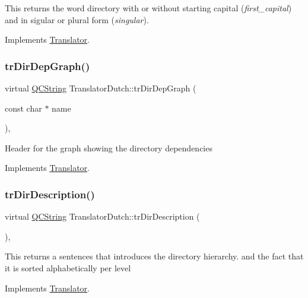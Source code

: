 This returns the word directory with or without starting capital ({\itshape first\+\_\+capital}) and in sigular or plural form ({\itshape singular}). 

Implements \mbox{\hyperlink{class_translator}{Translator}}.

\mbox{\label{class_translator_dutch_a8c004f960001b878331abb3cc622dd1a}} 
\subsubsection{\texorpdfstring{trDirDepGraph()}{trDirDepGraph()}}
{\footnotesize\ttfamily virtual \mbox{\hyperlink{class_q_c_string}{Q\+C\+String}} Translator\+Dutch\+::tr\+Dir\+Dep\+Graph (\begin{DoxyParamCaption}\item[{const char $\ast$}]{name }\end{DoxyParamCaption})\hspace{0.3cm}{\ttfamily [inline]}, {\ttfamily [virtual]}}

Header for the graph showing the directory dependencies 

Implements \mbox{\hyperlink{class_translator}{Translator}}.

\mbox{\label{class_translator_dutch_ae85350288d46c358b611b9de4c17dfcc}} 
\subsubsection{\texorpdfstring{trDirDescription()}{trDirDescription()}}
{\footnotesize\ttfamily virtual \mbox{\hyperlink{class_q_c_string}{Q\+C\+String}} Translator\+Dutch\+::tr\+Dir\+Description (\begin{DoxyParamCaption}{ }\end{DoxyParamCaption})\hspace{0.3cm}{\ttfamily [inline]}, {\ttfamily [virtual]}}

This returns a sentences that introduces the directory hierarchy. and the fact that it is sorted alphabetically per level 

Implements \mbox{\hyperlink{class_translator}{Translator}}.

